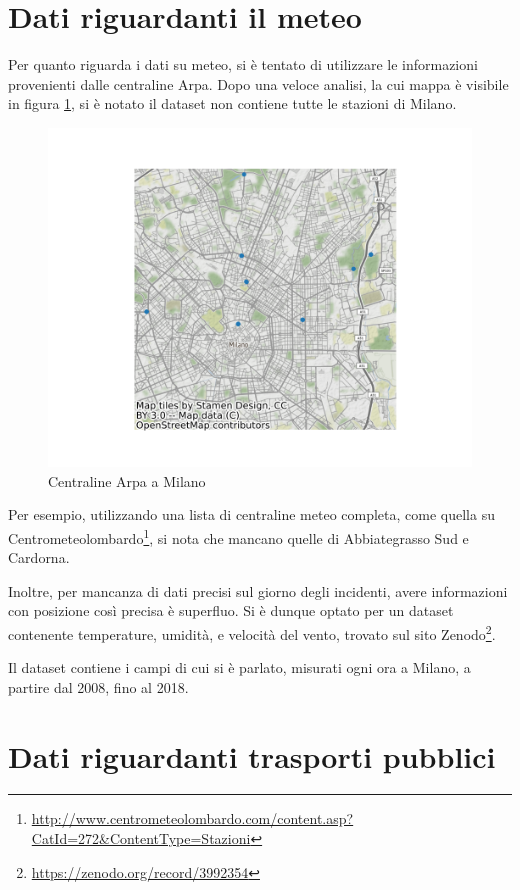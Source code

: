 \documentclass[a4paper,12pt]{report}
\begin{document}
\section{Dati riguardanti il meteo}

Per quanto riguarda i dati su meteo, si è tentato di utilizzare le informazioni 
provenienti dalle centraline Arpa. 
Dopo una veloce analisi, la cui mappa è visibile in figura \ref{fig:centraline-arpa}, 
si è notato il dataset non contiene tutte le stazioni di Milano.

\begin{figure}
    \hfill\includegraphics[width=0.7\linewidth]{../src/meteo/centraline_arpa.png}\hspace*{\fill}
    \caption{Centraline Arpa a Milano}
    \label{fig:centraline-arpa}
\end{figure}

Per esempio, utilizzando una lista di centraline meteo completa, come quella su 
Centrometeolombardo\footnote{\url{http://www.centrometeolombardo.com/content.asp?CatId=272&ContentType=Stazioni}}, 
si nota che mancano quelle di Abbiategrasso Sud e Cardorna.

Inoltre, per mancanza di dati precisi sul giorno degli incidenti, avere informazioni con 
posizione così precisa è superfluo.
Si è dunque optato per un dataset contenente temperature, umidità, e velocità del vento, 
trovato sul sito Zenodo\footnote{\url{https://zenodo.org/record/3992354}}.

Il dataset contiene i campi di cui si è parlato, misurati ogni ora a Milano, a partire 
dal 2008, fino al 2018.

\section{Dati riguardanti trasporti pubblici}
\end{document}

